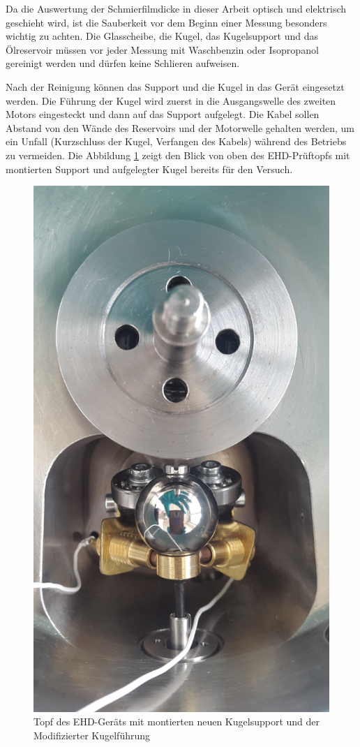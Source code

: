 Da die Auswertung der Schmierfilmdicke in dieser Arbeit optisch und elektrisch geschieht wird, ist die Sauberkeit vor dem Beginn einer Messung besonders wichtig zu achten.
Die Glasscheibe, die Kugel, das Kugelsupport und das Ölreservoir müssen vor jeder Messung mit Waschbenzin oder Isopropanol gereinigt werden und dürfen keine Schlieren aufweisen.

Nach der Reinigung können das Support und die Kugel in das Gerät eingesetzt werden.
Die Führung der Kugel wird zuerst in die Ausgangswelle des zweiten Motors eingesteckt und dann auf das Support aufgelegt.
Die Kabel sollen Abstand von den Wände des Reservoirs und der Motorwelle gehalten werden, um ein Unfall (Kurzschluss der Kugel, Verfangen des Kabels) während des Betriebs zu vermeiden.
Die Abbildung \ref{fig:ehd_topf_mit_kugel_und_support} zeigt den Blick von oben des EHD-Prüftopfs mit montierten Support und aufgelegter Kugel bereits für den Versuch.
\begin{figure}[htb]
    \centering
    \includegraphics[width=0.7\linewidth]{./images/ehd_topf_mit_kugel_und_support.jpg}
    \caption{Topf des EHD-Geräts mit montierten neuen Kugelsupport und der Modifizierter Kugelführung}
    \label{fig:ehd_topf_mit_kugel_und_support}
\end{figure}

